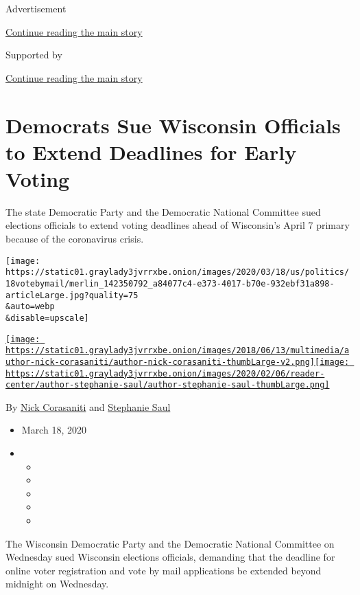 Advertisement

\protect\hyperlink{after-top}{Continue reading the main story}

Supported by

\protect\hyperlink{after-sponsor}{Continue reading the main story}

\hypertarget{democrats-sue-wisconsin-officials-to-extend-deadlines-for-early-voting}{%
\section{Democrats Sue Wisconsin Officials to Extend Deadlines for Early
Voting}\label{democrats-sue-wisconsin-officials-to-extend-deadlines-for-early-voting}}

The state Democratic Party and the Democratic National Committee sued
elections officials to extend voting deadlines ahead of Wisconsin's
April 7 primary because of the coronavirus crisis.

\texttt{[image: https://static01.graylady3jvrrxbe.onion/images/2020/03/18/us/politics/18votebymail/merlin\_142350792\_a84077c4-e373-4017-b70e-932ebf31a898-articleLarge.jpg?quality=75\\\&auto=webp\\\&disable=upscale]}

\href{https://www.nytimes3xbfgragh.onion/by/nick-corasaniti}{\texttt{[image: https://static01.graylady3jvrrxbe.onion/images/2018/06/13/multimedia/author-nick-corasaniti/author-nick-corasaniti-thumbLarge-v2.png]}}\href{https://www.nytimes3xbfgragh.onion/by/stephanie-saul}{\texttt{[image: https://static01.graylady3jvrrxbe.onion/images/2020/02/06/reader-center/author-stephanie-saul/author-stephanie-saul-thumbLarge.png]}}

By \href{https://www.nytimes3xbfgragh.onion/by/nick-corasaniti}{Nick
Corasaniti} and
\href{https://www.nytimes3xbfgragh.onion/by/stephanie-saul}{Stephanie
Saul}

\begin{itemize}
\item
  March 18, 2020
\item
  \begin{itemize}
  \item
  \item
  \item
  \item
  \item
  \end{itemize}
\end{itemize}

The Wisconsin Democratic Party and the Democratic National Committee on
Wednesday sued Wisconsin elections officials, demanding that the
deadline for online voter registration and vote by mail applications be
extended beyond midnight on Wednesday.

